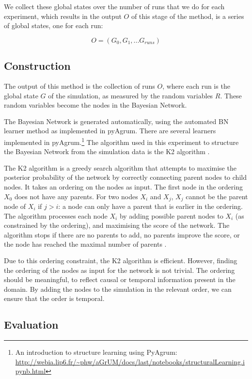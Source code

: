 \documentclass[12pt]{article}
\begin{document}
We collect these global states over the number of runs that we do for each experiment, which results in the output $O$ of this stage of the method, is a series of global states, one for each run:

\[ O = (G_0, G_1, ... G_{runs})\]


\subsection{Construction}
The output of this method is the collection of runs $O$, where each run is the global state $G$ of the simulation, as measured by the random variables $R$. These random variables become the nodes in the Bayesian Network.

The Bayesian Network is generated automatically, using the automated BN learner method as implemented in pyAgrum. There are several learners implemented in pyAgrum.\footnote{An introduction to structure learning using PyAgrum: \url{http://webia.lip6.fr/~phw/aGrUM/docs/last/notebooks/structuralLearning.ipynb.html}} The algorithm used in this experiment to structure the Bayesian Network from the simulation data is the K2 algorithm \citep{Cooper1992}. 

The K2 algorithm is a greedy search algorithm that attempts to maximise the posterior probability of the network by correctly connecting parent nodes to child nodes. It takes an ordering on the nodes as input. The first node in the ordering $X_0$ does not have any parents. For two nodes $X_i$ and $X_j$, $X_j$ cannot be the parent node of $X_i$ if $j > i$: a node can only have a parent that is earlier in the ordering. The algorithm processes each node $X_i$ by adding possible parent nodes to $X_i$ (as constrained by the ordering), and maximising the score of the network. The algorithm stops if there are no parents to add, no parents improve the score, or the node has reached the maximal number of parents \citep{Chen2008}.

Due to this ordering constraint, the K2 algorithm is efficient. However, finding the ordering of the nodes as input for the network is not trivial. The ordering should be meaningful, to reflect causal or temporal information present in the domain. By adding the nodes to the simulation in the relevant order, we can ensure that the order is temporal. 



\subsection{Evaluation}
\end{document}
